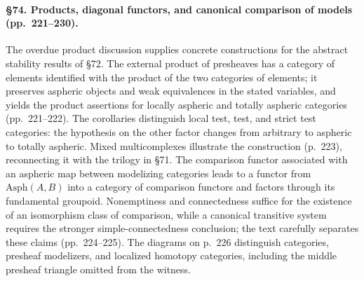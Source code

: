 \paragraph{\S74. Products, diagonal functors, and canonical comparison of models (pp.\ 221--230).}
The overdue product discussion supplies concrete constructions for the abstract stability results of \S72. The external product of presheaves has a category of elements identified with the product of the two categories of elements; it preserves aspheric objects and weak equivalences in the stated variables, and yields the product assertions for locally aspheric and totally aspheric categories (pp.\ 221--222). The corollaries distinguish local test, test, and strict test categories: the hypothesis on the other factor changes from arbitrary to aspheric to totally aspheric. Mixed multicomplexes illustrate the construction (p.\ 223), reconnecting it with the trilogy in \S71. The comparison functor associated with an aspheric map between modelizing categories leads to a functor from $\mathrm{Asph}(A,B)$ into a category of comparison functors and factors through its fundamental groupoid. Nonemptiness and connectedness suffice for the existence of an isomorphism class of comparison, while a canonical transitive system requires the stronger simple-connectedness conclusion; the text carefully separates these claims (pp.\ 224--225). The diagrams on p.\ 226 distinguish categories, presheaf modelizers, and localized homotopy categories, including the middle presheaf triangle omitted from the witness.
